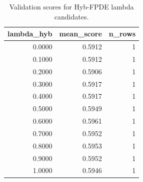 \begin{table}[t]
\caption{Validation scores for Hyb-FPDE lambda candidates.}
\label{tab:lambda_distribution_computed}
\centering
\begin{tabular}{rrr}
\toprule
lambda\_hyb & mean\_score & n\_rows \\
\midrule
0.0000 & 0.5912 & 1 \\
0.1000 & 0.5912 & 1 \\
0.2000 & 0.5906 & 1 \\
0.3000 & 0.5917 & 1 \\
0.4000 & 0.5917 & 1 \\
0.5000 & 0.5949 & 1 \\
0.6000 & 0.5961 & 1 \\
0.7000 & 0.5952 & 1 \\
0.8000 & 0.5953 & 1 \\
0.9000 & 0.5952 & 1 \\
1.0000 & 0.5946 & 1 \\
\bottomrule
\end{tabular}

\end{table}
